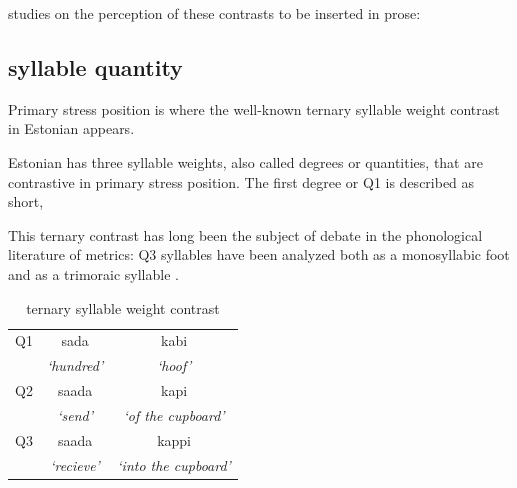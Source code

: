 studies on the perception of these contrasts to be inserted in prose: 

\citep{meisterPerceptionShortVs2011a, kaskPerceptualAsymmetriesAuditory2021, eekSimplePerceptionExperiments1997}


\subsection{syllable quantity}
Primary stress position is where the well-known ternary syllable weight contrast in Estonian appears.




Estonian has three syllable weights, also called degrees or quantities, that are contrastive in primary stress position. The first degree or Q1 is described as short, 

This ternary contrast has long been the subject of debate in the phonological literature of metrics: Q3 syllables have been analyzed both as a monosyllabic foot \citep{princeMetricalTheoryEstonian1980} and as a trimoraic syllable \citep{hayesCompensatoryLengtheningMoraic1989, kuznetsovaEstonianWordProsody2018,prillopMoraeEstonianReply2020}. 



%
%
%
 \begin{table}[htb]
\centering
\begin{tabular}{lcc}
\hline

Q1 &		 sada 		& 	kabi  \\  
	&	 {\it `hundred'} 	&	 {\it`hoof' }\\
\hline
Q2 &		saada 		&	kapi \\
	&	 {\it`send' }		&	{\it`of the cupboard' }		\\
\hline
Q3 &		saada 	&	 kappi 	\\
	&	{\it`recieve' }	&	{\it`into the cupboard' }	\\
\hline
\end{tabular}
\label{qexamps}
\caption{ternary syllable weight contrast}
\end{table}


